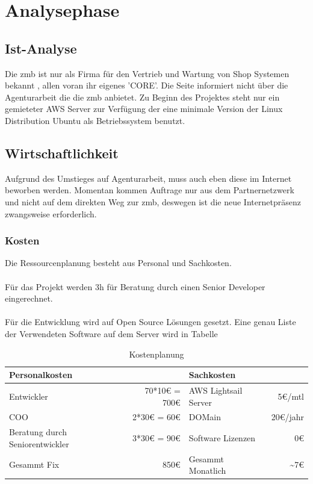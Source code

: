\documentclass[11pt,a4paper]{article}
\begin{document}
\section{Analysephase}
\subsection{Ist-Analyse}
Die zmb ist nur als Firma für den Vertrieb und Wartung von Shop Systemen bekannt , allen voran ihr eigenes 'CORE'. Die Seite informiert nicht über die Agenturarbeit die die zmb anbietet. 
Zu Beginn des Projektes steht nur ein gemieteter AWS Server zur Verfügung der eine minimale   Version der Linux Distribution Ubuntu als Betriebssystem benutzt. 
\subsection{Wirtschaftlichkeit}
Aufgrund des Umstieges auf Agenturarbeit, muss auch eben diese  im Internet beworben werden. Momentan kommen Auftrage nur aus dem Partnernetzwerk und nicht auf dem direkten Weg zur zmb, deswegen ist die neue Internetpräsenz zwangsweise erforderlich.
\subsubsection{Kosten}
Die Ressourcenplanung besteht aus Personal und Sachkosten.\\\\
Für das Projekt werden 3h für Beratung durch einen Senior Developer eingerechnet.\\\\
Für die Entwicklung wird auf Open Source Lösungen gesetzt. Eine genau Liste der Verwendeten Software auf dem Server wird in Tabelle %
\begin{table}[!ht]
  \centering
     \begin{tabular}{l|r||l|r}
       \textbf{Personalkosten}  & &\textbf{Sachkosten}& \\
       \hline
       Entwickler      &    70*10€ = 700€    &  AWS Lightsail Server      &     5€/mtl\\
       COO    &  2*30€ = 60€               	    &  \acs{DOM}ain & 20€/jahr\\
       Beratung durch Seniorentwickler    &  3*30€ = 90€ & Software Lizenzen & 0€	\\ 
       \hline
       \hline
       Gesammt Fix& 850€ & Gesammt Monatlich & \textasciitilde 7€  \\
     \end{tabular}
\caption{Kostenplanung}
\label{tbl:Kostenplanung}
\end{table}
\end{document}
